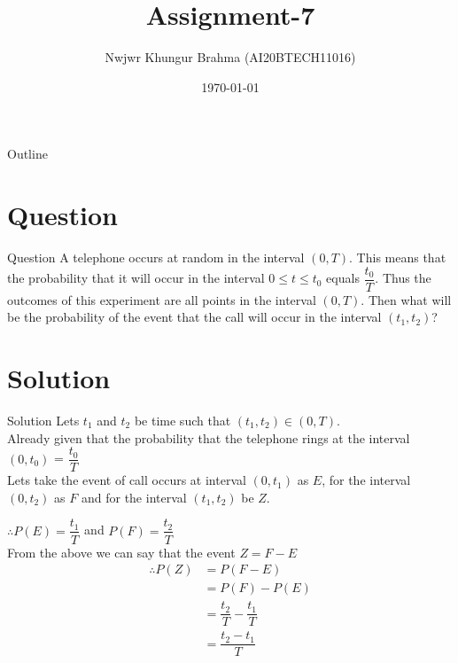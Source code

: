 \documentclass{beamer}
\title{Assignment-7}
\author{Nwjwr Khungur Brahma (AI20BTECH11016)}
\date{\today}
\begin{document}
\begin{frame}
\titlepage
\end{frame}

\begin{frame}{Outline}
\tableofcontents
\end{frame}

\section{Question}
\begin{frame}{Question}
A telephone occurs at random in the interval $(0,T)$. This means that the probability that it will occur in the interval $0\leq t \leq t_0$ equals $\dfrac{t_0}{T}$. Thus the outcomes of this experiment are all points in the interval $(0,T)$. Then what will be the probability of the event that the call will occur in the interval $(t_1,t_2)$?
\end{frame}

\section{Solution}
\begin{frame}{Solution}
Lets $t_1$ and $t_2$ be time such that $(t_1,t_2) \in (0,T)$.\\
Already given that the probability that the telephone rings at the interval $(0,t_0)$ = $\dfrac{t_0}{T}$\\
Lets take the event of call occurs at interval $(0,t_1)$ as $E$, for the interval $(0,t_2)$ as $F$ and for the interval $(t_1,t_2)$ be $Z$.
\end{frame}

\begin{frame}
$\therefore P(E)= \dfrac{t_1}{T}$ and $P(F)=\dfrac{t_2}{T}$\\
From the above we can say that the event $Z = F-E$\\
\begin{align}
\therefore P(Z) &= P(F-E)\\
&=P(F)-P(E)\\
&=\dfrac{t_2}{T}-\dfrac{t_1}{T}\\
&=\dfrac{t_2-t_1}{T}
\end{align}
\end{frame}
\end{document}
